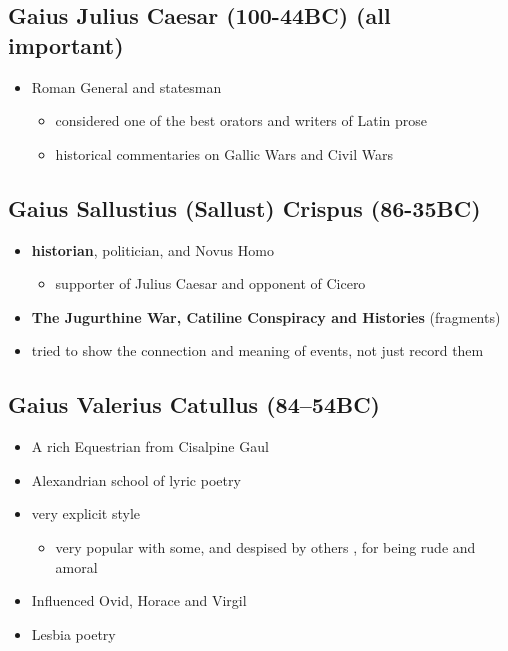 \documentclass[12pt, twoside]{article}
\begin{document}
\subsection{Gaius Julius Caesar (100-44BC) (all important)}
\begin{itemize}
\item Roman General and statesman 
	\begin{itemize}
	\item considered one of the best orators and writers of Latin prose
	\item historical commentaries on Gallic Wars and Civil Wars
	\end{itemize}
\end{itemize}

\subsection{Gaius Sallustius (Sallust) Crispus (86-35BC)}
\begin{itemize}
\item \textbf{historian}, politician, and Novus Homo 
	\begin{itemize}
	\item supporter of Julius Caesar and opponent of Cicero
	\end{itemize}
\item \textbf{The Jugurthine War, Catiline Conspiracy and  Histories}  (fragments)
\item tried to show the connection and meaning of events, not just record them
\end{itemize}

\subsection{Gaius Valerius Catullus (84–54BC)}
\begin{itemize}
\item A  rich Equestrian from Cisalpine Gaul
\item Alexandrian school of lyric poetry
\item very explicit style 
	\begin{itemize}
	\item very popular with some, and despised by others , for being rude and amoral
	\end{itemize}
\item Influenced Ovid, Horace and Virgil
\item Lesbia poetry
\end{itemize}
\end{document}
